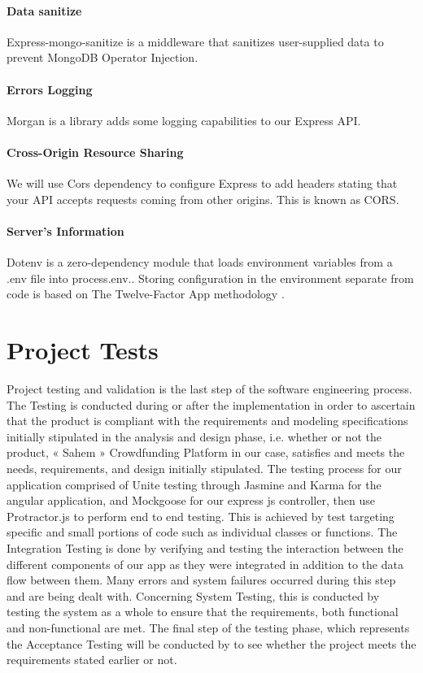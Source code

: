 \paragraph*{Data sanitize}
Express-mongo-sanitize is a middleware that sanitizes user-supplied data to prevent MongoDB Operator Injection.

\paragraph*{Errors Logging}
Morgan is a library adds some logging capabilities to our Express API.

\paragraph*{Cross-Origin Resource Sharing}
We will use Cors dependency to configure Express to add headers stating that your API accepts requests coming from other origins. This is known as \ac{CORS}.
\paragraph*{Server's Information}
Dotenv is a zero-dependency module that loads environment variables from a .env file into process.env.. Storing configuration in the environment separate from code is based on The Twelve-Factor App methodology \cite{web004}.





\section{Project Tests}
Project testing and validation is the last step of the software engineering process. The
Testing is conducted during or after the implementation in order to ascertain that the product is
compliant with the requirements and modeling specifications initially stipulated in the
analysis and design phase, i.e. whether or not the product, « Sahem » Crowdfunding Platform
in our case, satisfies and meets the needs, requirements, and design initially stipulated.
The testing process for our application comprised of Unite testing through Jasmine and Karma for
the angular application, and Mockgoose for our express js controller, then use Protractor.js to perform
end to end testing.
This is achieved by test targeting specific and small portions of code such as individual classes or
functions. 
The Integration Testing is done by verifying and testing the interaction between the
different components of our app as they were integrated in addition to the data flow between
them.
 Many errors and system failures occurred during this step and are being dealt
with. Concerning System Testing, this is conducted by testing the system as a whole to ensure
that the requirements, both functional and non-functional are met. The final step of the testing
phase, which represents the Acceptance Testing will be conducted by \mentor to see whether the project
meets the requirements stated earlier or not.

